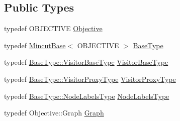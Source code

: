 \subsection*{Public Types}
\begin{DoxyCompactItemize}
\item 
typedef O\+B\+J\+E\+C\+T\+I\+V\+E \hyperlink{classnifty_1_1graph_1_1optimization_1_1mincut_1_1MincutQpbo_ad5d16b8f42da9e1330dbd9cc9b0435aa}{Objective}
\item 
typedef \hyperlink{classnifty_1_1graph_1_1optimization_1_1mincut_1_1MincutBase}{Mincut\+Base}$<$ O\+B\+J\+E\+C\+T\+I\+V\+E $>$ \hyperlink{classnifty_1_1graph_1_1optimization_1_1mincut_1_1MincutQpbo_ae39f92ee24b678b688d88571f5b09160}{Base\+Type}
\item 
typedef \hyperlink{classnifty_1_1graph_1_1optimization_1_1common_1_1SolverBase_a5a14d64c70a9cc0eebc7d71d2b089f9b}{Base\+Type\+::\+Visitor\+Base\+Type} \hyperlink{classnifty_1_1graph_1_1optimization_1_1mincut_1_1MincutQpbo_aba6eaaa013ca021676e82152a22e7d55}{Visitor\+Base\+Type}
\item 
typedef \hyperlink{classnifty_1_1graph_1_1optimization_1_1common_1_1SolverBase_a58913ea9ab9232ff72608b710c1012d0}{Base\+Type\+::\+Visitor\+Proxy\+Type} \hyperlink{classnifty_1_1graph_1_1optimization_1_1mincut_1_1MincutQpbo_a1675bc1767efc807ca32b1e7b74133f1}{Visitor\+Proxy\+Type}
\item 
typedef \hyperlink{classnifty_1_1graph_1_1optimization_1_1common_1_1SolverBase_a6e4e465f3b6e039882669fcfb9714818}{Base\+Type\+::\+Node\+Labels\+Type} \hyperlink{classnifty_1_1graph_1_1optimization_1_1mincut_1_1MincutQpbo_aac9ec9c574aa36724795a7596e887834}{Node\+Labels\+Type}
\item 
typedef Objective\+::\+Graph \hyperlink{classnifty_1_1graph_1_1optimization_1_1mincut_1_1MincutQpbo_aeb7891501082b7dbaa4545bda1667e6d}{Graph}
\end{DoxyCompactItemize}
